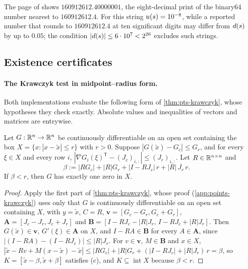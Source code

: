 \begin{remark}\label{rem:audit-fac1}
The page of  shows $160912612.40000001$, the eight-decimal print of the binary64 number nearest to $160912612.4$.
For this string $u(s)=10^{-8}$, while a reported number that rounds to $160912612.4$ at ten significant digits may differ from $d(s)$ by up to $0.05$; the condition $|d(s)|\le6\cdot10^{7}<2^{26}$ excludes such strings.
\end{remark}

\subsection{Existence certificates}\label{app:audit-existence}

\paragraph{The Krawczyk test in midpoint–radius form.}
Both implementations evaluate the following form of \cref{thm:pts-krawczyk}, whose hypotheses they check exactly.
Absolute values and inequalities of vectors and matrices are entrywise.

\begin{lemma}\label{lem:audit-krawczyk}
Let $G:\mathbb{R}^n\to\mathbb{R}^n$ be continuously differentiable on an open set containing the box $X=\{x:|x-\tilde x|\le r\}$ with $r>0$.
Suppose $|G(\tilde x)-G_c|\le G_r$, and for every $\xi\in X$ and every row $i$, $|\nabla G_i(\xi)^{\mathsf T}-(J_c)_{i,:}|\le(J_r)_{i,:}$.
Let $R\in\mathbb{R}^{n\times n}$ and
\[
  \beta:=|RG_c|+|R|G_r+|I-RJ_c|\,r+|R|\,J_r\,r .
\]
If $\beta<r$, then $G$ has exactly one zero in $X$.
\end{lemma}

\begin{proof}
Apply the first part of \cref{thm:pts-krawczyk}, whose proof (\cref{app:points-krawczyk}) uses only that $G$ is continuously differentiable on an open set containing $X$, with $y=\tilde x$, $C=R$, $\mathbf v=[G_c-G_r,G_c+G_r]$, $\mathbf A=[J_c-J_r,J_c+J_r]$ and $\mathbf B=[I-RJ_c-|R|J_r,\,I-RJ_c+|R|J_r]$.
Then $G(\tilde x)\in\mathbf v$, $G'(\xi)\in\mathbf A$ on $X$, and $I-RA\in\mathbf B$ for every $A\in\mathbf A$, since $|(I-RA)-(I-RJ_c)|\le|R|J_r$.
For $v\in\mathbf v$, $M\in\mathbf B$ and $x\in X$, $|\tilde x-Rv+M(x-\tilde x)-\tilde x|\le|RG_c|+|R|G_r+(|I-RJ_c|+|R|J_r)\,r=\beta$, so $K=[\tilde x-\beta,\tilde x+\beta]$ satisfies (c), and $K\subseteq\operatorname{int}X$ because $\beta<r$.
\end{proof}

